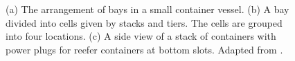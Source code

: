 \begin{figure}[tbh]
  \centering
  $\qquad$
	\\
  ~
	\qquad
  ~
  $\qquad$
\caption{(a) The arrangement of bays in a small container vessel. (b) A bay divided into cells given by stacks and tiers. The cells are grouped into four locations. (c) A side view of a stack of containers with power plugs for reefer containers at bottom slots. {Adapted from \cite{AlbertosThesis}.}}
\label{fig:bay}
\end{figure}

